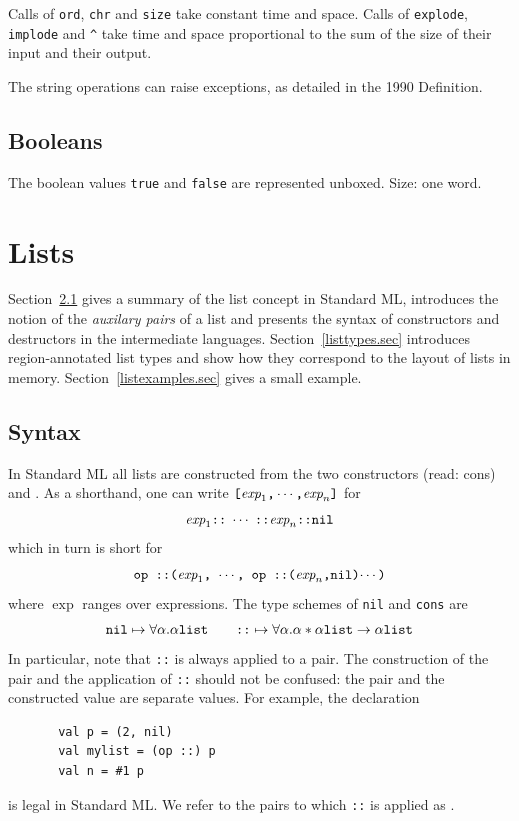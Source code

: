 \documentclass[12pt]{book}
\begin{document}
Calls of {\tt ord}, {\tt chr} and {\tt size} take constant time and space.
Calls of {\tt explode}, {\tt implode} and \verb+^+ take time and space proportional to
the sum of the size of their input and their output.

The string operations can raise exceptions, as detailed in the 1990 Definition.

\section{Booleans}
The boolean values {\tt true} and {\tt false}
are represented unboxed. Size: one word.
%
\chapter{Lists}
\label{lists.sec}
%
Section~\ref{lsyn.sec} gives
a summary of the list concept in Standard ML, introduces
the notion of the {\em auxilary pairs} of a list and presents the
syntax of constructors and destructors in the intermediate languages.
Section~\ref{listtypes.sec} introduces region-annotated list types and
show how they correspond to the layout of lists in memory. 
Section~\ref{listexamples.sec} gives a small example.
\section{Syntax}
\label{lsyn.sec}
In Standard ML all lists are constructed 
from the two constructors \boxml{::} (read: cons)
and .   
As a shorthand, one can write $\hbox{\tt [}\hbox{\it exp}_1\hbox{\tt ,}\cdots
\hbox{\tt ,}\hbox{\it exp}_n\hbox{\tt ]}$ for
$$ \hbox{\it exp}_1\hbox{\tt ::}\; \cdots\; \hbox{\tt ::} \hbox{\it exp}_n\hbox{\tt ::}\hbox{\tt nil}$$
which in turn is short for
$$ \hbox{\tt op ::($\hbox{\it exp}_1$, $\cdots$, op ::($\hbox{\it exp}_n$,nil)$\cdots$)}$$
where $\exp$ ranges over expressions. 
The type schemes of {\tt nil} and {\tt cons} are
$$\hbox{\tt nil}\mapsto\forall\alpha.\alpha\hbox{\tt list}\qquad
  \hbox{\tt ::} \mapsto\forall\alpha.\alpha\ast\alpha\hbox{\tt list}\to\alpha\hbox{\tt list}
$$
In particular, note that {\tt ::} is always applied to a pair. The construction
of the pair and the application of {\tt ::} should not be confused: the pair and the
constructed value are separate values.
For example, the declaration
\begin{verbatim}
       val p = (2, nil)
       val mylist = (op ::) p
       val n = #1 p
\end{verbatim}
is legal in Standard ML. We refer to the pairs to which {\tt ::} is applied
as .
\end{document}

